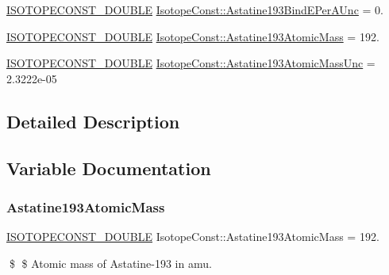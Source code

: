 \begin{DoxyCompactItemize}
\mbox{\hyperlink{group___isotope_const-_macros_ga8f45a7272ce02c0b4c65c44636ed719a}{I\+S\+O\+T\+O\+P\+E\+C\+O\+N\+S\+T\+\_\+\+D\+O\+U\+B\+LE}} \mbox{\hyperlink{group___isotope_const-_astatine-_at193_ga80a1a250c0254ae41fd542c5ca88ce74}{Isotope\+Const\+::\+Astatine193\+Bind\+E\+Per\+A\+Unc}} = 0.
\item 
\mbox{\hyperlink{group___isotope_const-_macros_ga8f45a7272ce02c0b4c65c44636ed719a}{I\+S\+O\+T\+O\+P\+E\+C\+O\+N\+S\+T\+\_\+\+D\+O\+U\+B\+LE}} \mbox{\hyperlink{group___isotope_const-_astatine-_at193_gac9810e279105dd41620e1d1523471af4}{Isotope\+Const\+::\+Astatine193\+Atomic\+Mass}} = 192.
\item 
\mbox{\hyperlink{group___isotope_const-_macros_ga8f45a7272ce02c0b4c65c44636ed719a}{I\+S\+O\+T\+O\+P\+E\+C\+O\+N\+S\+T\+\_\+\+D\+O\+U\+B\+LE}} \mbox{\hyperlink{group___isotope_const-_astatine-_at193_gade428b1788d5d2828fb3f22656c52fbf}{Isotope\+Const\+::\+Astatine193\+Atomic\+Mass\+Unc}} = 2.\+3222e-\/05
\end{DoxyCompactItemize}


\subsection{Detailed Description}


\subsection{Variable Documentation}
\mbox{\label{group___isotope_const-_astatine-_at193_gac9810e279105dd41620e1d1523471af4}} 
\subsubsection{\texorpdfstring{Astatine193\+Atomic\+Mass}{Astatine193AtomicMass}}
{\footnotesize\ttfamily \mbox{\hyperlink{group___isotope_const-_macros_ga8f45a7272ce02c0b4c65c44636ed719a}{I\+S\+O\+T\+O\+P\+E\+C\+O\+N\+S\+T\+\_\+\+D\+O\+U\+B\+LE}} Isotope\+Const\+::\+Astatine193\+Atomic\+Mass = 192.}

\$ \$ Atomic mass of Astatine-\/193 in amu. \mbox{\label{group___isotope_const-_astatine-_at193_gade428b1788d5d2828fb3f22656c52fbf}} 
